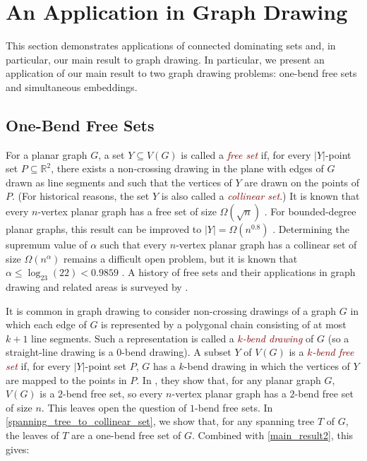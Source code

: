 \documentclass[a4paper,UKenglish, cleveref, autoref, thm-restate]{lipics-v2021}
\newcommand{\R}{\mathbb{R}}
\newcommand{\defin}[1]{\emph{\textcolor{Maroon}{#1}}}
\begin{document}

\section{An Application in Graph Drawing}
\label{gd}

This section demonstrates applications of connected dominating sets and, in particular, our main result to graph drawing. In particular, we present an application of our main result to two graph drawing problems: one-bend free sets and simultaneous embeddings. 

\subsection{One-Bend Free Sets}

For a planar graph $G$, a set $Y\subseteq V(G)$ is called a \defin{free set} if, for every $|Y|$-point set $P\subseteq\R^2$, there exists a non-crossing drawing in the plane with edges of $G$ drawn as line segments and such that the vertices of $Y$ are drawn on the points of $P$.  (For historical reasons, the set $Y$ is also called a \defin{collinear set}.)  It is known that every $n$-vertex planar graph has a free set of size $\Omega(\sqrt{n})$ \cite{bose.dujmovic:polynomial,dujmovic:utility,dujmovic.frati.ea:every}.
For bounded-degree planar graphs, this result can be improved to $|Y|=\Omega(n^{0.8})$ \cite{dujmovic.morin:dual}.  Determining the supremum value of $\alpha$ such that every $n$-vertex planar graph has a collinear set of size $\Omega(n^{\alpha})$ remains a difficult open problem, but it is known that $\alpha \le \log_{23}(22)<0.9859$ \cite{ravsky.verbitsky:collinear}. A history of free sets and their applications in graph drawing and related areas is surveyed by \cite{dujmovic.morin:free}.

It is common in graph drawing to consider non-crossing drawings of a graph $G$ in which each edge of $G$ is represented by a polygonal chain consisting of at most $k+1$ line segments.  Such a representation is called a \defin{$k$-bend drawing} of $G$ (so a straight-line drawing is a $0$-bend drawing). A subset $Y$ of $V(G)$ is a \defin{$k$-bend free set} if, for every $|Y|$-point set $P$,  $G$ has a $k$-bend drawing in which the vertices of $Y$ are mapped to the points in $P$. In \cite{KaufmannWiese2002}, they show that, for any planar graph $G$, $V(G)$ is a $2$-bend free set, so every $n$-vertex planar graph has a $2$-bend free set of size $n$. This leaves open the question of $1$-bend free sets.  
In \cref{spanning_tree_to_collinear_set}, we show that, for any spanning tree $T$ of $G$, the leaves of $T$ are a one-bend free set of $G$.  Combined with \cref{main_result2}, this gives:
\end{document}
